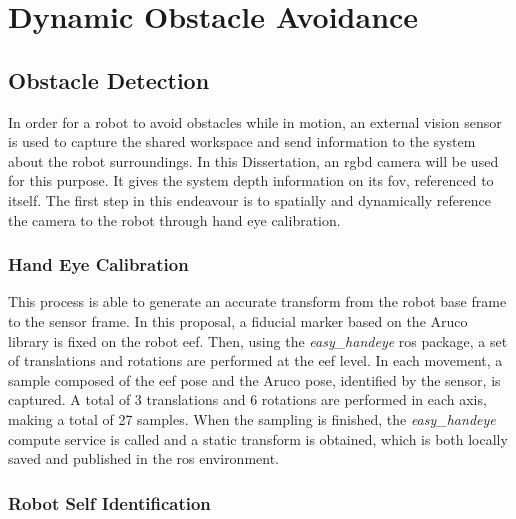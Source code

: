 \chapter{Dynamic Obstacle Avoidance}
\label{chp:4-obstacle}






\section{Obstacle Detection}
\label{section:obstacle-detection}

\par In order for a robot to avoid obstacles while in motion, an external vision sensor is used to capture the shared workspace and send information to the system about the robot surroundings. In this Dissertation, an \ac{rgbd} camera will be used for this purpose. It gives the system depth information on its \ac{fov}, referenced to itself. The first step in this endeavour is to spatially and dynamically reference the camera to the robot through hand eye calibration. 



\subsection{Hand Eye Calibration}

\par This process is able to generate an accurate transform from the robot base frame to the sensor frame. In this proposal, a fiducial marker based on the Aruco library \cite{aruco} is fixed on the robot \ac{eef}. Then, using the \textit{easy\_handeye} \ac{ros} package, a set of translations and rotations are performed at the \ac{eef} level. In each movement, a sample composed of the \ac{eef} pose and the Aruco pose, identified by the sensor, is captured. A total of 3 translations and 6 rotations are performed in each axis, making a total of 27 samples. When the sampling is finished, the \textit{easy\_handeye} compute service is called and a static transform is obtained, which is both locally saved and published in the \ac{ros} environment.




\subsection{Robot Self Identification}

